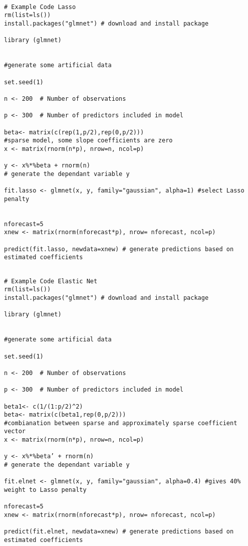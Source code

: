 \documentclass[12pt]{article}
\begin{document}
\begin{lstlisting}[title=\textbf{Lasso Regression.}]

# Example Code Lasso
rm(list=ls())
install.packages("glmnet") # download and install package

library (glmnet)


#generate some artificial data

set.seed(1)

n <- 200  # Number of observations

p <- 300  # Number of predictors included in model

beta<- matrix(c(rep(1,p/2),rep(0,p/2)))
#sparse model, some slope coefficients are zero
x <- matrix(rnorm(n*p), nrow=n, ncol=p)

y <- x%*%beta + rnorm(n)
# generate the dependant variable y

fit.lasso <- glmnet(x, y, family="gaussian", alpha=1) #select Lasso penalty


nforecast=5
xnew <- matrix(rnorm(nforecast*p), nrow= nforecast, ncol=p)

predict(fit.lasso, newdata=xnew) # generate predictions based on estimated coefficients

\end{lstlisting}

\begin{lstlisting}[title=\textbf{Elastic Net Regression.}]

# Example Code Elastic Net
rm(list=ls())
install.packages("glmnet") # download and install package

library (glmnet)


#generate some artificial data

set.seed(1)

n <- 200  # Number of observations

p <- 300  # Number of predictors included in model

beta1<- c(1/(1:p/2)^2)
beta<- matrix(c(beta1,rep(0,p/2)))
#combianation between sparse and approximately sparse coefficient vector
x <- matrix(rnorm(n*p), nrow=n, ncol=p)

y <- x%*%beta’ + rnorm(n)
# generate the dependant variable y

fit.elnet <- glmnet(x, y, family="gaussian", alpha=0.4) #gives 40% weight to Lasso penalty

nforecast=5
xnew <- matrix(rnorm(nforecast*p), nrow= nforecast, ncol=p)

predict(fit.elnet, newdata=xnew) # generate predictions based on estimated coefficients

\end{lstlisting}
\end{document}
